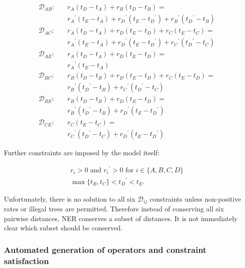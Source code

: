 \documentclass[10pt,letterpaper]{article}
\begin{document}
\begin{align}
	\mathcal{D}_{AB}: \quad & r_A  (t_D - t_A) + r_B  (t_D - t_B) = \nonumber \\
					 & {r_A}^\prime  (t_E - t_A) + {r_D}^\prime  (t_E - {t_D}^\prime) + {r_B}^\prime ({t_D}^\prime - t_B) \\
	\mathcal{D}_{AC}: \quad & r_A  (t_D - t_A) + r_D  (t_E - t_D) + r_C  (t_E - t_C) = \nonumber \\
				 	  & {r_A}^\prime  (t_E - t_A) + {r_D}^\prime  (t_E - {t_D}^\prime) + {r_C}^\prime ({t_D}^\prime - t_C) \\
 	\mathcal{D}_{AE}: \quad & r_A  (t_D - t_A) + r_D  (t_E - t_D)= \nonumber \\
					  & {r_A}^\prime  (t_E - t_A) \\
  	\mathcal{D}_{BC}: \quad & r_B  (t_D - t_B) + r_D  (t_E - t_D) + r_C  (t_E - t_D)= \nonumber \\
					  & {r_B}^\prime ({t_D}^\prime - t_B) + {r_C}^\prime ({t_D}^\prime - t_C) \\
   	\mathcal{D}_{BE}: \quad & r_B  (t_D - t_B) + r_D  (t_E - t_D)= \nonumber \\
					  & {r_B}^\prime ({t_D}^\prime - t_B) + {r_D}^\prime (t_E - {t_D}^\prime) \\
	\mathcal{D}_{CE}: \quad & r_C  (t_E - t_C)= \nonumber \\
					  & {r_C}^\prime ({t_D}^\prime - t_C) + {r_D}^\prime (t_E - {t_D}^\prime) 
\end{align}


Further constraints are imposed by the model itself:


\begin{align}
	r_i > 0 \text{ and } {r_i}^\prime > 0 \text { for } i \in \{A,B,C,D\} \\
	\max\{t_B, t_C \} < {t_D}^\prime < t_E.
\end{align}



Unfortunately, there is no solution to all six $\mathcal{D}_{ij}$ constraints unless non-positive rates or illegal trees are permitted.
 Therefore instead of conserving all six pairwise distances, NER conserves a subset of distances. It is not immediately clear which subset should be conserved. 


\subsubsection*{Automated generation of operators and constraint satisfaction}
\end{document}
